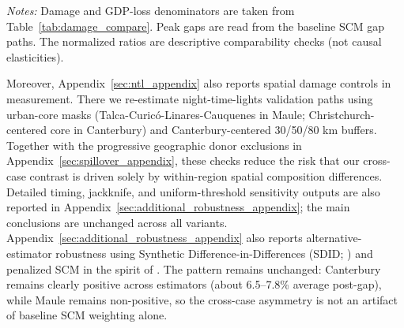 \documentclass[12pt]{article}
\begin{document}
\begin{table}[H]
\centering
\caption{\textbf{Cross-case comparability calibration: normalized effect benchmarks}}
\label{tab:comparability_calibration}
\footnotesize
\setlength{\tabcolsep}{5pt}
\begin{minipage}{0.95\textwidth}\footnotesize\vspace{1ex}
\textit{Notes:} Damage and GDP-loss denominators are taken from Table~\ref{tab:damage_compare}. Peak gaps are read from the baseline SCM gap paths. The normalized ratios are descriptive comparability checks (not causal elasticities).
\end{minipage}
\end{table}

Moreover, Appendix~\ref{sec:ntl_appendix} also reports spatial damage controls in measurement. There we re-estimate night-time-lights validation paths using urban-core masks (Talca-Curicó-Linares-Cauquenes in Maule; Christchurch-centered core in Canterbury) and Canterbury-centered 30/50/80 km buffers. Together with the progressive geographic donor exclusions in Appendix~\ref{sec:spillover_appendix}, these checks reduce the risk that our cross-case contrast is driven solely by within-region spatial composition differences. Detailed timing, jackknife, and uniform-threshold sensitivity outputs are also reported in Appendix~\ref{sec:additional_robustness_appendix}; the main conclusions are unchanged across all variants. Appendix~\ref{sec:additional_robustness_appendix} also reports alternative-estimator robustness using Synthetic Difference-in-Differences (SDID; \cite{arkhangelsky2021sdid}) and penalized SCM in the spirit of \textcite{abadie2021penalized}. The pattern remains unchanged: Canterbury remains clearly positive across estimators (about 6.5--7.8\% average post-gap), while Maule remains non-positive, so the cross-case asymmetry is not an artifact of baseline SCM weighting alone.
\end{document}
